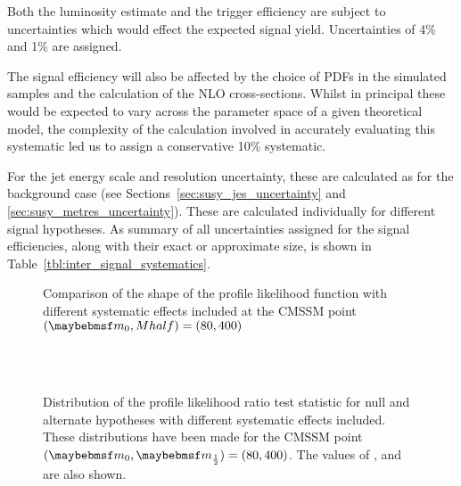 Both the luminosity estimate and the trigger efficiency are subject to
uncertainties which would effect the expected signal yield. Uncertainties of 4\%
and 1\% are assigned.

The signal efficiency will also be affected by the choice of \acp{PDF} in the
simulated samples and the calculation of the \ac{NLO} cross-sections. Whilst in
principal these would be expected to vary across the parameter space of a given
theoretical model, the complexity of the calculation involved in accurately
evaluating this systematic led us to assign a conservative 10\% systematic.

For the jet energy scale and \MET resolution uncertainty, these are calculated
as for the background case (see Sections~\ref{sec:susy_jes_uncertainty} and
\ref{sec:susy_metres_uncertainty}). These are calculated individually for
different signal hypotheses. As summary of all uncertainties assigned for the
signal efficiencies, along with their exact or approximate size, is shown in
Table~\ref{tbl:inter_signal_systematics}.




\begin{figure}[h!]
\centering
{}\quad
{}
\caption{Comparison of the shape of the profile likelihood function with
  different systematic effects included at the \ac{CMSSM} point $(\Mzero, Mhalf)
  = (80, 400)$}
\label{fig:inter_pl}
\end{figure}

\begin{figure}[h!]
\centering
{}\quad
{}\\
\quad
{}\\
\caption[Distribution of the profile likelihood ratio test statistic for null
and alternate hypotheses with different systematic effects
included]{Distribution of the profile likelihood ratio test statistic for null
  and alternate hypotheses with different systematic effects included. These
  distributions have been made for the \ac{CMSSM} point $(\Mzero, \Mhalf) = (80,
  400)$. The values of \CLb, \CLspb and \CLs are also shown.}
\label{fig:inter_cls}
\end{figure}

